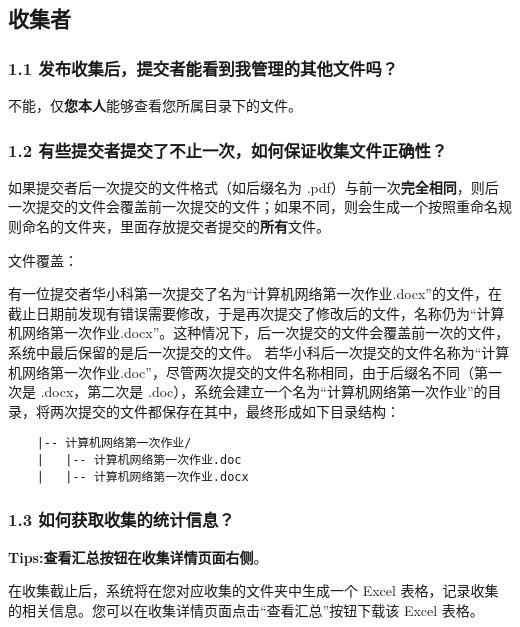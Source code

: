 \documentclass[lang=cn,11pt,a4paper]{elegantpaper}
\begin{document}
\subsection{收集者}

\subsubsection*{1.1 发布收集后，提交者能看到我管理的其他文件吗？}

不能，仅\textbf{您本人}能够查看您所属目录下的文件。

\subsubsection*{1.2 有些提交者提交了不止一次，如何保证收集文件正确性？}

如果提交者后一次提交的文件格式（如后缀名为 .pdf）与前一次{\bf 完全相同}，则后一次提交的文件会覆盖前一次提交的文件；如果不同，则会生成一个按照重命名规则命名的文件夹，里面存放提交者提交的\textbf{所有}文件。

\begin{example}
	文件覆盖：
	
	有一位提交者{华小科}第一次提交了名为“计算机网络第一次作业.docx”的文件，在截止日期前发现有错误需要修改，于是再次提交了修改后的文件，名称仍为“计算机网络第一次作业.docx”。这种情况下，后一次提交的文件会覆盖前一次的文件，系统中最后保留的是后一次提交的文件。
若华小科后一次提交的文件名称为“计算机网络第一次作业.doc”，尽管两次提交的文件名称相同，由于后缀名不同（第一次是 .docx，第二次是 .doc），系统会建立一个名为“计算机网络第一次作业”的目录，将两次提交的文件都保存在其中，最终形成如下目录结构：


\begin{lstlisting}
	|-- 计算机网络第一次作业/
	|   |-- 计算机网络第一次作业.doc
	|   |-- 计算机网络第一次作业.docx
\end{lstlisting}

\end{example}

\subsubsection*{1.3 如何获取收集的统计信息？}


{\bf Tips:查看汇总按钮在收集详情页面右侧}。

在收集截止后，系统将在您对应收集的文件夹中生成一个 Excel 表格，记录收集的相关信息。您可以在收集详情页面点击“查看汇总”按钮下载该 Excel 表格。
\end{document}
